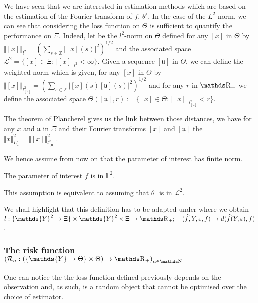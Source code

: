 \bigskip

We have seen that we are interested in estimation methods which are based on the estimation of the Fourier transform of $f$, $\theta^{\circ}$.
In the case of the $L^{2}$-norm, we can see that considering the loss function on $\Theta$ is sufficient to quantify the performance on $\Xi$.
Indeed, let be the $l^{2}$-norm on $\Theta$ defined for any $[x]$ in $\Theta$ by $\Vert [x] \Vert_{l^{2}} = (\sum_{s \in \mathds{Z}} \vert [x](s) \vert^{2})^{1/2}$ and the associated space $\mathcal{L}^{2} = \{[x] \in \Xi: \Vert [x] \Vert_{l^{2}} < \infty\}$.
Given a sequence $[\mathfrak{u}]$ in $\Theta$, we can define the weighted norm which is given, for any $[x]$ in $\Theta$ by $\Vert [x] \Vert_{l^{2}_{[\mathfrak{u}]}} = (\sum_{s \in \mathds{Z}} \vert [x](s) [\mathfrak{u}](s) \vert^{2})^{1/2}$ and for any $r$ in $\R_{+}$ we define the associated space $\Theta({[\mathfrak{u}]}, r) := \{[x] \in \Theta: \Vert [x] \Vert_{l^{2}_{[\mathfrak{u}]}} < r\}$.

The theorem of Plancherel gives us the link between those distances, we have for any $x$ and $\mathfrak{u}$ in $\Xi$ and their Fourier transforms $[x]$ and $[\mathfrak{u}]$ the $\Vert x \Vert^{2}_{L^{2}_{\mathfrak{u}}} = \Vert [x] \Vert_{l_{[\mathfrak{u}]}^{2}}^{2}$.

We hence assume from now on that the parameter of interest has finite norm.

\begin{as}\label{AS_INTRO_FREQ_DECISION_THETAL2}
The parameter of interest $f$ is in $\mathds{L}^{2}$.
\assEnd
\end{as}

This assumption is equivalent to assuming that $\theta^{\circ}$ is in $\mathcal{L}^{2}$.

We shall highlight that this definition has to be adapted under  where we obtain $ l : \{\mathds{Y}^{2} \rightarrow \Xi\} \times \mathds{Y}^{2} \times \Xi \rightarrow \R_{+}; \quad (\widehat{f}, Y, \epsilon, f) \mapsto d(\widehat{f}(Y, \epsilon), f)$.

\subsubsection{The risk function $\left(\mathcal{R}_{n} : (\{\mathds{Y} \rightarrow \Theta\} \times \Theta) \rightarrow \R_{+}\right)_{n \in \N}$}\label{INTRO_FREQ_DECISION_RISKFUNCION}
One can notice the the loss function defined previously depends on the observation and, as such, is a random object that cannot be optimised over the choice of estimator.

